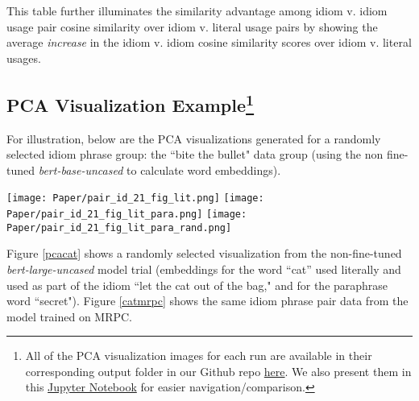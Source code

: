 \documentclass[11pt,a4paper]{article}
\begin{document}
This table further illuminates the similarity advantage among idiom v. idiom usage pair cosine similarity over idiom v. literal usage pairs by showing the average \textit{increase} in the idiom v. idiom cosine similarity scores over idiom v. literal usages.

\vspace{1mm}


\subsection{PCA Visualization Example\footnote{All of the PCA visualization images for each run are available in their corresponding output folder in our Github repo \href{https://github.com/spacemanidol/AnalyzingNeuralLanguageModelsGroup1/tree/master/vector_similarity/output}{here}. We also present them in this \href{https://github.com/spacemanidol/AnalyzingNeuralLanguageModelsGroup1/blob/master/vector_similarity/run_vector_similarity_words_comparison.ipynb}{Jupyter Notebook} for easier navigation/comparison.}}\label{section:pcaviz}
For illustration, below are the PCA visualizations generated for a randomly selected idiom phrase group: the ``bite the bullet" data group (using the non fine-tuned \textit{bert-base-uncased} to calculate word embeddings).

\texttt{[image: Paper/pair\_id\_21\_fig\_lit.png]}
\texttt{[image: Paper/pair\_id\_21\_fig\_lit\_para.png]}
\texttt{[image: Paper/pair\_id\_21\_fig\_lit\_para\_rand.png]}




Figure \ref{pcacat} shows a randomly selected visualization from the non-fine-tuned \textit{bert-large-uncased} model trial (embeddings for the word ``cat'' used literally and used as part of the idiom ``let the cat out of the bag," and for the paraphrase word ``secret"). Figure \ref{catmrpc} shows the same idiom phrase pair data from the model trained on MRPC.
\end{document}
